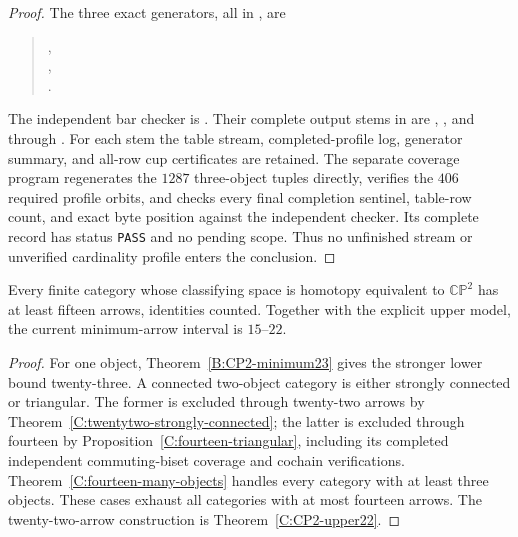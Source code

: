 \begin{proof}
The three exact generators, all in , are
\begin{quote}\small
{},\\
,\\
.
\end{quote}
The independent bar checker is
.
Their complete output stems in  are
,
, and
 through
.
For each stem the table stream, completed-profile log, generator
summary, and all-row cup certificates are retained.
The separate coverage program
 regenerates the
$1287$ three-object tuples directly, verifies the $406$ required
profile orbits, and checks every final completion sentinel,
table-row count, and exact byte position against the independent
checker.  Its complete record
 has status
\texttt{PASS} and no pending scope.  Thus no unfinished stream
or unverified cardinality profile enters the conclusion.
\end{proof}

\begin{theorem}
\label{C:CP2-lower15}
Every finite category whose classifying space is homotopy
equivalent to $\mathbb {CP}^2$ has at least fifteen arrows,
identities counted.  Together with the explicit upper model,
the current minimum-arrow interval is $15$--$22$.
\end{theorem}
\begin{proof}
For one object, Theorem~\ref{B:CP2-minimum23} gives the stronger
lower bound twenty-three.  A connected two-object category is
either strongly connected or triangular.  The former is excluded
through twenty-two arrows by
Theorem~\ref{C:twentytwo-strongly-connected}; the latter is
excluded through fourteen by
Proposition~\ref{C:fourteen-triangular}, including its completed
independent commuting-biset coverage and cochain verifications.
Theorem~\ref{C:fourteen-many-objects} handles every category with
at least three objects.  These cases exhaust all categories with
at most fourteen arrows.  The twenty-two-arrow construction is
Theorem~\ref{C:CP2-upper22}.
\end{proof}
